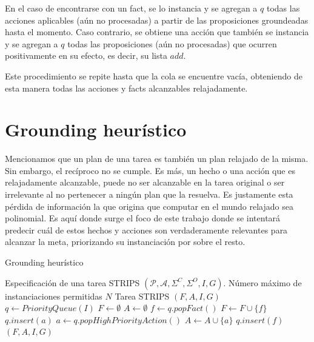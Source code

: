 En el caso de encontrarse con un fact, se lo instancia y se agregan a $q$ todas
las acciones aplicables (aún no procesadas) a partir de las proposiciones
groundeadas hasta el momento. Caso contrario, se obtiene una acción que también
se instancia y se agregan a $q$ todas las proposiciones (aún no procesadas) que
ocurren positivamente en su efecto, es decir, su lista $add$.

Este procedimiento se repite hasta que la cola se encuentre vacía, obteniendo de
esta manera todas las acciones y facts alcanzables relajadamente.

\section{Grounding heurístico}
\label{lit:heuristic_grounding}

Mencionamos que un plan de una tarea es también un plan relajado de la misma.
Sin embargo, el recíproco no se cumple. Es más, un hecho o una acción que es
relajadamente alcanzable, puede no ser alcanzable en la tarea original o ser
irrelevante al no pertenecer a ningún plan que la resuelva. Es justamente esta
pérdida de información la que origina que computar en el mundo relajado sea
polinomial. Es aquí donde surge el foco de este trabajo donde se intentará
predecir cuál de estos hechos y acciones son verdaderamente relevantes para
alcanzar la meta, priorizando su instanciación por sobre el resto.

\begin{algorithm}[h!]
    \caption{Grounding heurístico}\label{alg:grounding-heuristico}
    \begin{algorithmic}[1]
    \Require Especificación de una tarea STRIPS $(\mathcal{P}, \mathcal{A},
    \Sigma^{C}, \Sigma^{O}, I, G)$. Número máximo de instanciaciones permitidas
    $N$ \Ensure Tarea STRIPS $(F, A, I, G)$ \State $q \gets PriorityQueue(I)$
    \State $F \gets \emptyset$ \State $A \gets \emptyset$     
     \State $f \gets q.popFact()$ \State $F \gets F \cup
        \{f\}$  \State $q.insert(a)$
        \EndFor \Else \State $a \gets q.popHighPriorityAction()$ \State $A \gets
        A \cup \{a\}$  \State $q.insert(f)$
        \EndFor \EndIf \EndWhile \State \Return $(F, A, I, G)$
    \end{algorithmic}
\end{algorithm}

